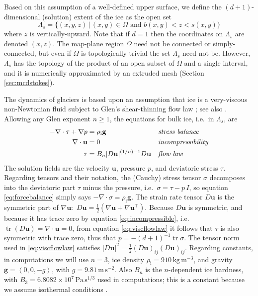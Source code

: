 \documentclass[letterpaper,final,12pt,reqno]{amsart}
\theoremstyle{claim}
\newcommand{\grad}{\nabla}
\newcommand{\Div}{\nabla\cdot}
\newcommand{\trace}{\operatorname{tr}}
\newcommand{\bg}{\mathbf{g}}
\newcommand{\bu}{\mathbf{u}}
\newcommand{\rhoi}{\rho_{\text{i}}}
\numberwithin{equation}{section}
\numberwithin{figure}{section}
\numberwithin{table}{section}
\numberwithin{theorem}{section}
\begin{document}
Based on this assumption of a well-defined upper surface, we define the $(d+1)$-dimensional (solution) extent of the ice as the open set
\begin{equation}
\Lambda_s = \{(x,y,z)\,|\,(x,y) \in \Omega \text{ and } b(x,y) < z < s(x,y)\} \label{eq:lambdas}
\end{equation}
where $z$ is vertically-upward.  Note that if $d=1$ then the coordinates on $\Lambda_s$ are denoted $(x,z)$.  The map-plane region $\Omega$ need not be connected or simply-connected, but even if $\Omega$ is topologically trivial the set $\Lambda_s$ need not be.  However, $\Lambda_s$ has the topology of the product of an open subset of $\Omega$ and a single interval, and it is numerically approximated by an extruded mesh (Section \ref{sec:mcdstokes}).

The dynamics of glaciers is based upon an assumption that ice is a very-viscous non-Newtonian fluid subject to Glen's shear-thinning flow law \cite{GreveBlatter2009}; see also \cite[Chapter 1]{FowlerNg2021}.  Allowing any Glen exponent $n\ge 1$, the equations for bulk ice, i.e.~in $\Lambda_s$, are
\begin{align}
- \nabla \cdot \tau + \nabla p &= \rhoi \bg &&\text{\emph{stress balance}} \label{eq:forcebalance} \\
\nabla \cdot \bu &= 0 &&\text{\emph{incompressibility}} \label{eq:incompressible} \\
\tau &= B_n |D\bu|^{(1/n) - 1} D\bu  &&\text{\emph{flow law}} \label{eq:viscflowlaw}
\end{align}
The solution fields are the velocity $\bu$, pressure $p$, and deviatoric stress $\tau$.  Regarding tensors and their notation, the (Cauchy) stress tensor $\sigma$ decomposes into the deviatoric part $\tau$ minus the pressure, i.e.~$\sigma = \tau - p\,I$, so equation \eqref{eq:forcebalance} simply says $-\Div \sigma = \rhoi \bg$.  The strain rate tensor $D\bu$ is the symmetric part of $\grad \bu$: \,$D\bu = \frac{1}{2} \left(\grad\bu + \grad\bu^\top\right)$.  Because $D\bu$ is symmetric, and because it has trace zero by equation \eqref{eq:incompressible}, i.e.~$\trace(D\bu)=\nabla \cdot \bu = 0$, from equation \eqref{eq:viscflowlaw} it follows that $\tau$ is also symmetric with trace zero, thus that $p=-(d+1)^{-1} \trace \sigma$.  The tensor norm used in \eqref{eq:viscflowlaw} satisfies $|D\bu|^2 = \frac{1}{2} (D\bu)_{ij} (D\bu)_{ij}$.  Regarding constants, in computations we will use $n=3$, ice density $\rhoi=910 \,\text{kg}\,\text{m}^{-3}$, and gravity $\bg=\left<0,0,-g\right>$, with $g=9.81\,\text{m}\,\text{s}^{-2}$.  Also $B_n$ is the $n$-dependent ice hardness, with $B_3=6.8082\times 10^7\,\text{Pa}\,\text{s}^{1/3}$ used in computations; this is a constant because we assume isothermal conditions \cite{GreveBlatter2009}.
\end{document}
